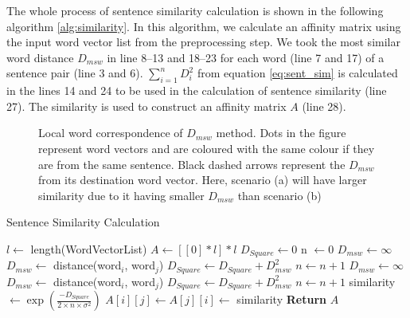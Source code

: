 The whole process of sentence similarity calculation is shown in the following algorithm \ref{alg:similarity}. In this algorithm, we calculate an affinity matrix using the input word vector list from the preprocessing step. We took the most similar word distance $D_{msw}$ in line 8--13 and 18--23 for each word (line 7 and 17) of a sentence pair (line 3 and 6). $\sum^n_{i=1}D_i^2$ from equation \ref{eq:sent_sim} is calculated in the lines 14 and 24 to be used in the calculation of sentence similarity (line 27). The similarity is used to construct an affinity matrix $A$ (line 28).
\begin{figure}
    \centering
    
    \caption{Local word correspondence of $D_{msw}$ method. Dots in the figure represent word vectors and are coloured with the same colour if they are from the same sentence. Black dashed arrows represent the $D_{msw}$ from its destination word vector. Here, scenario (a) will have larger similarity due to it having smaller $D_{msw}$ than scenario (b)}
    \label{fig:msd}
\end{figure}
\begin{algorithm} \caption{Sentence Similarity Calculation} \label{alg:similarity}
\begin{algorithmic}[1]
    \State $l \gets$ length(WordVectorList)
    \State $A \gets [ [ 0 ] * l ] * l$
        \State $D_{Square} \gets 0$
        \State n $\gets 0$
                \State $D_{msw} \gets \infty$
                        \State $D_{msw} \gets$ distance(word$_i$, word$_j$)
                    \EndIf
                \EndFor
                \State $D_{Square} \gets D_{Square} + D_{msw}^2$
                \State $n \gets n+1$ 
            \EndFor
                \State $D_{msw} \gets \infty$
                        \State $D_{msw} \gets$ distance(word$_i$, word$_j$)
                    \EndIf
                \EndFor
                \State $D_{Square} \gets D_{Square} + D_{msw}^2$
                \State $n \gets n+1$
            \EndFor
            \State similarity $\gets \exp \left( \frac{- D_{Square}}{2 \times n \times \sigma^2} \right)$
            \State $A[i][j] \gets A[j][i] \gets$ similarity
        \EndFor
    \EndFor
    \State \textbf{Return} $A$
\end{algorithmic}
\end{algorithm}

